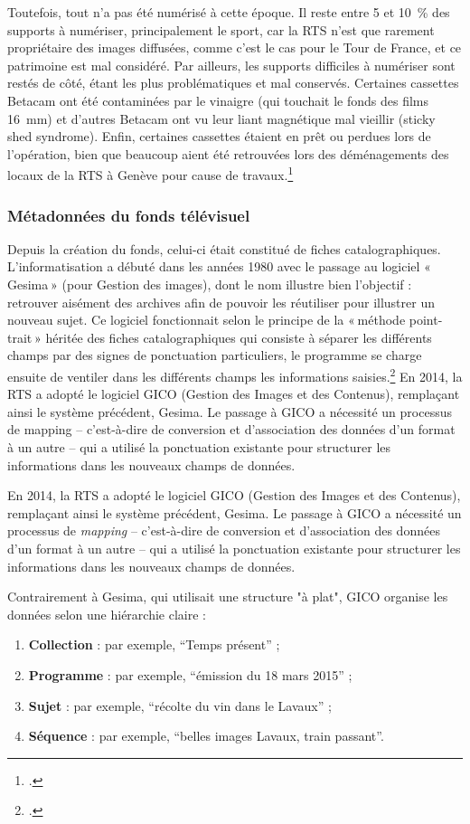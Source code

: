 Toutefois, tout n’a pas été numérisé à cette époque. Il reste entre 5 et 10 \% des supports à numériser, principalement le sport, car la RTS n’est que rarement propriétaire des images diffusées, comme c’est le cas pour le Tour de France, et ce patrimoine est mal considéré. Par ailleurs, les supports difficiles à numériser sont restés de côté, étant les plus problématiques et mal conservés. Certaines cassettes Betacam ont été contaminées par le vinaigre (qui touchait le fonds des films 16 mm) et d’autres Betacam ont vu leur liant magnétique mal vieillir (sticky shed syndrome). Enfin, certaines cassettes étaient en prêt ou perdues lors de l’opération, bien que beaucoup aient été retrouvées lors des déménagements des locaux de la RTS à Genève pour cause de travaux.\footcite{barcella2024a}

\subsubsection{Métadonnées du fonds télévisuel}

Depuis la création du fonds, celui-ci était constitué de fiches catalographiques. L’informatisation a débuté dans les années 1980 avec le passage au logiciel « Gesima » (pour Gestion des images), dont le nom illustre bien l’objectif : retrouver aisément des archives afin de pouvoir les réutiliser pour illustrer un nouveau sujet. Ce logiciel fonctionnait selon le principe de la « méthode point-trait » héritée des fiches catalographiques qui consiste à séparer les différents champs par des signes de ponctuation particuliers, le programme se charge ensuite de ventiler dans les différents champs les informations saisies.\footcite{barcella2024a}
En 2014, la RTS a adopté le logiciel GICO (Gestion des Images et des Contenus), remplaçant ainsi le système précédent, Gesima. Le passage à GICO a nécessité un processus de mapping – c'est-à-dire de conversion et d'association des données d'un format à un autre – qui a utilisé la ponctuation existante pour structurer les informations dans les nouveaux champs de données.
	
	En 2014, la RTS a adopté le logiciel GICO (Gestion des Images et des Contenus), remplaçant ainsi le système précédent, Gesima. Le passage à GICO a nécessité un processus de \emph{mapping} – c'est-à-dire de conversion et d'association des données d'un format à un autre – qui a utilisé la ponctuation existante pour structurer les informations dans les nouveaux champs de données.
	
	Contrairement à Gesima, qui utilisait une structure "à plat", GICO organise les données selon une hiérarchie claire :
	\begin{enumerate}
		\item \textbf{Collection} : par exemple, \enquote{Temps présent} ;
		\item \textbf{Programme} : par exemple, \enquote{émission du 18 mars 2015} ; 
		\item \textbf{Sujet} : par exemple, \enquote{récolte du vin dans le Lavaux} ;
		\item \textbf{Séquence} : par exemple, \enquote{belles images Lavaux, train passant}.
	\end{enumerate}
	
